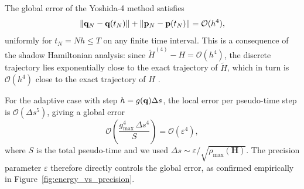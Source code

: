 The global error of the Yoshida-4 method satisfies
\begin{equation}
  \|\mathbf{q}_N - \mathbf{q}(t_N)\| + \|\mathbf{p}_N - \mathbf{p}(t_N)\|
  = \mathcal{O}(h^4),
  \label{eq:global_error}
\end{equation}
uniformly for $t_N = Nh \leq T$ on any finite time interval.
This is a consequence of the shadow Hamiltonian analysis: since
$\tilde{H}^{(4)} - H = \mathcal{O}(h^4)$, the discrete trajectory
lies exponentially close to the exact trajectory of $\tilde{H}$,
which in turn is $\mathcal{O}(h^4)$ close to the exact trajectory
of $H$ \citep[Theorem~IX.3.5]{HairerLubichWanner2006}.

For the adaptive case with step $h = g(\mathbf{q})\Delta s$, the
local error per pseudo-time step is
$\mathcal{O}(\Delta s^5)$, giving a global error
\begin{equation}
  \mathcal{O}\!\left(\frac{g_{\max}^4\,\Delta s^4}{S}\right)
  = \mathcal{O}(\varepsilon^4),
  \label{eq:adaptive_global_error}
\end{equation}
where $S$ is the total pseudo-time and we used
$\Delta s \sim \varepsilon/\sqrt{\rho_{\max}(\mathbf{H})}$.
The precision parameter $\varepsilon$ therefore directly controls
the global error, as confirmed empirically in
Figure~\ref{fig:energy_vs_precision}.

